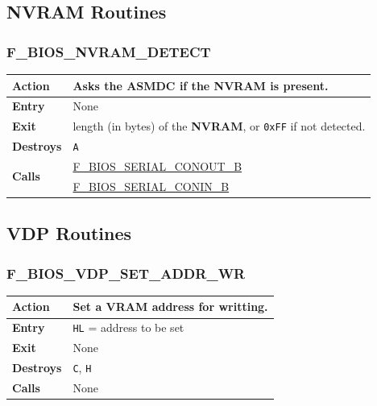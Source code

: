 \documentclass[a4paper,11pt]{article}
\begin{document}
    \subsection{NVRAM Routines}

        \subsubsection{F\_BIOS\_NVRAM\_DETECT}
        \label{func:fbiosnvramdetect}
        \begin{tabular}{l p{9cm}}
            \hline\textbf{Action}
            & Asks the \textbf{ASMDC} if the \textbf{NVRAM} is present. \\
            \hline\textbf{Entry} & None \\
            \hline\textbf{Exit} & length (in bytes) of the \textbf{NVRAM}, or
            \texttt{0xFF} if not detected.\\
            \hline\textbf{Destroys} & \texttt{A} \\
            \hline\multirow[t]{2}{4em}{\textbf{Calls}}
            & \hyperref[func:fbiosserialconoutb]{F\_BIOS\_SERIAL\_CONOUT\_B}\\
            & \hyperref[func:fbiosserialconinb]{F\_BIOS\_SERIAL\_CONIN\_B}\\
            \hline
        \end{tabular}

    \subsection{VDP Routines}

        \subsubsection{F\_BIOS\_VDP\_SET\_ADDR\_WR}
        \label{func:fbiosvdpsetaddrwr}
        \begin{tabular}{l p{9cm}}
            \hline\textbf{Action}
            & Set a \textbf{VRAM} address for writting. \\
            \hline\textbf{Entry} & \texttt{HL} = address to be set\\
            \hline\textbf{Exit} & None\\
            \hline\textbf{Destroys} & \texttt{C}, \texttt{H} \\
            \hline\textbf{Calls} & None\\
            \hline
        \end{tabular}
\end{document}
